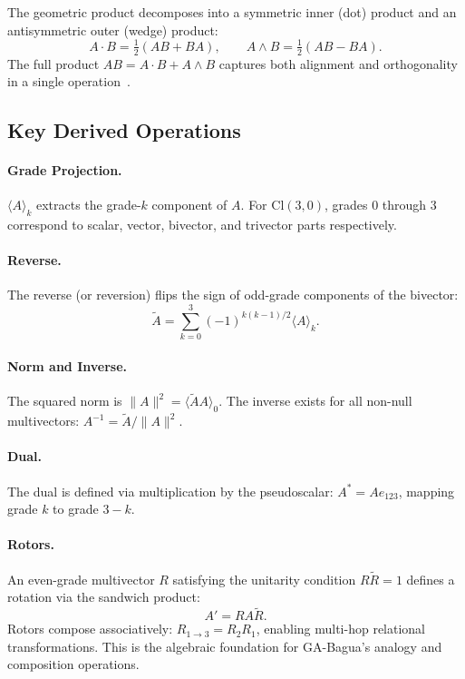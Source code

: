 \documentclass[11pt,a4paper]{article}
\newcommand{\Cl}{\mathrm{Cl}}
\newcommand{\grade}[1]{\langle #1 \rangle}
\newcommand{\rev}[1]{\widetilde{#1}}
\newcommand{\dual}[1]{#1^*}
\begin{document}
The geometric product decomposes into a symmetric inner (dot) product and an
antisymmetric outer (wedge) product:
\begin{equation}
  A \cdot B = \tfrac{1}{2}(AB + BA), \qquad
  A \wedge B = \tfrac{1}{2}(AB - BA).
\end{equation}
The full product $AB = A \cdot B + A \wedge B$ captures both alignment and
orthogonality in a single operation~\cite{hestenes1984clifford,doran2003geometric,lounesto2001clifford}.

\subsection{Key Derived Operations}

\paragraph{Grade Projection.} $\grade{A}_k$ extracts the grade-$k$ component
of $A$. For $\Cl(3,0)$, grades 0 through 3 correspond to scalar, vector,
bivector, and trivector parts respectively.

\paragraph{Reverse.} The reverse (or reversion) flips the sign of odd-grade
components of the bivector:
\begin{equation}
  \rev{A} = \sum_{k=0}^{3} (-1)^{k(k-1)/2} \grade{A}_k.
\end{equation}

\paragraph{Norm and Inverse.} The squared norm is $\|A\|^2 = \grade{\rev{A} A}_0$.
The inverse exists for all non-null multivectors: $A^{-1} = \rev{A} / \|A\|^2$.

\paragraph{Dual.} The dual is defined via multiplication by the pseudoscalar:
$\dual{A} = A e_{123}$, mapping grade $k$ to grade $3-k$.

\paragraph{Rotors.} An even-grade multivector $R$ satisfying the unitarity
condition $R \rev{R} = 1$ defines a rotation via the sandwich product:
\begin{equation}
  A' = R A \rev{R}.
\end{equation}
Rotors compose associatively: $R_{1 \to 3} = R_2 R_1$, enabling multi-hop
relational transformations. This is the algebraic foundation for GA-Bagua's
analogy and composition operations.
\end{document}
